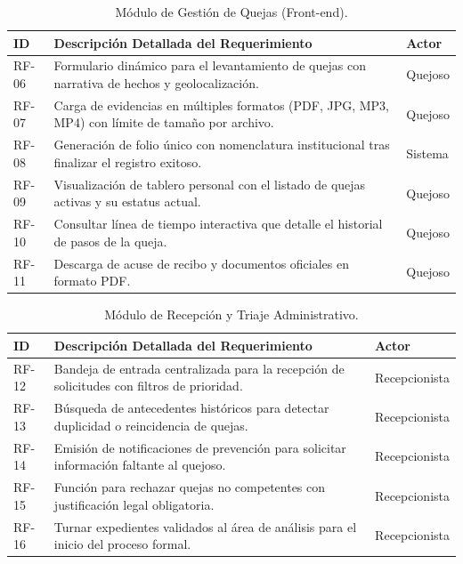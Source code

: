 \begin{table}[h!]
\centering
\scriptsize
\caption{Módulo de Gestión de Quejas (Front-end).}
\label{tab:rf_frontend}
\begin{tabular}{@{} l p{9.5cm} l @{}}
\toprule
\rowcolor[HTML]{2D3E50} 
\textbf{\color[HTML]{FFFFFF} ID} & \textbf{\color[HTML]{FFFFFF} Descripción Detallada del Requerimiento} & \textbf{\color[HTML]{FFFFFF} Actor} \\ \midrule
RF-06 & Formulario dinámico para el levantamiento de quejas con narrativa de hechos y geolocalización. & Quejoso \\
\rowcolor[HTML]{F2F4F7} 
RF-07 & Carga de evidencias en múltiples formatos (PDF, JPG, MP3, MP4) con límite de tamaño por archivo. & Quejoso \\
RF-08 & Generación de folio único con nomenclatura institucional tras finalizar el registro exitoso. & Sistema \\
\rowcolor[HTML]{F2F4F7} 
RF-09 & Visualización de tablero personal con el listado de quejas activas y su estatus actual. & Quejoso \\
RF-10 & Consultar línea de tiempo interactiva que detalle el historial de pasos de la queja. & Quejoso \\
\rowcolor[HTML]{F2F4F7} 
RF-11 & Descarga de acuse de recibo y documentos oficiales en formato PDF. & Quejoso \\ \bottomrule
\end{tabular}
\end{table}

\begin{table}[h!]
\centering
\scriptsize
\caption{Módulo de Recepción y Triaje Administrativo.}
\label{tab:rf_recepcion}
\begin{tabular}{@{} l p{9.5cm} l @{}}
\toprule
\rowcolor[HTML]{2D3E50} 
\textbf{\color[HTML]{FFFFFF} ID} & \textbf{\color[HTML]{FFFFFF} Descripción Detallada del Requerimiento} & \textbf{\color[HTML]{FFFFFF} Actor} \\ \midrule
RF-12 & Bandeja de entrada centralizada para la recepción de solicitudes con filtros de prioridad. & Recepcionista \\
\rowcolor[HTML]{F2F4F7} 
RF-13 & Búsqueda de antecedentes históricos para detectar duplicidad o reincidencia de quejas. & Recepcionista \\
RF-14 & Emisión de notificaciones de prevención para solicitar información faltante al quejoso. & Recepcionista \\
\rowcolor[HTML]{F2F4F7} 
RF-15 & Función para rechazar quejas no competentes con justificación legal obligatoria. & Recepcionista \\
RF-16 & Turnar expedientes validados al área de análisis para el inicio del proceso formal. & Recepcionista \\ \bottomrule
\end{tabular}
\end{table}

